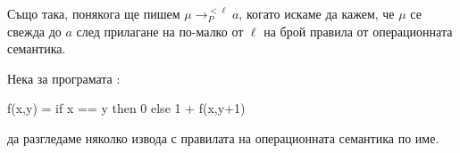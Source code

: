 \begin{description}
\begin{figure}[h!]
\begin{prooftree}
    \end{prooftree}
  \end{figure}
\item
  \begin{figure}[h!]
    \begin{prooftree}
    \end{prooftree}
  \end{figure}
\end{description}

\newpage

Също така, понякога ще пишем $\mu \to^{<\ell}_P a$, когато искаме да кажем, че
$\mu$ се свежда до $a$ след прилагане на по-малко от $\ell$ на брой правила от операционната семантика.



\begin{example}
  Нека за програмата :
  \begin{haskellcode}
    f(x,y) = if x == y then 0 else 1 + f(x,y+1)
  \end{haskellcode}
  да разгледаме няколко извода с правилата на операционната семантика по име.
\end{example}


